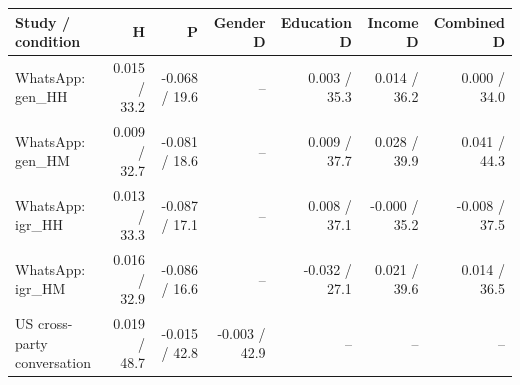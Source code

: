 
\begin{tabular}{lrrrrrr}
\toprule
Study / condition & H & P & Gender D & Education D & Income D & Combined D\\
\midrule
WhatsApp: gen\_HH & 0.015 / 33.2 & -0.068 / 19.6 & -- & 0.003 / 35.3 & 0.014 / 36.2 & 0.000 / 34.0\\
WhatsApp: gen\_HM & 0.009 / 32.7 & -0.081 / 18.6 & -- & 0.009 / 37.7 & 0.028 / 39.9 & 0.041 / 44.3\\
WhatsApp: igr\_HH & 0.013 / 33.3 & -0.087 / 17.1 & -- & 0.008 / 37.1 & -0.000 / 35.2 & -0.008 / 37.5\\
WhatsApp: igr\_HM & 0.016 / 32.9 & -0.086 / 16.6 & -- & -0.032 / 27.1 & 0.021 / 39.6 & 0.014 / 36.5\\
US cross-party conversation & 0.019 / 48.7 & -0.015 / 42.8 & -0.003 / 42.9 & -- & -- & --\\
\bottomrule
\end{tabular}
